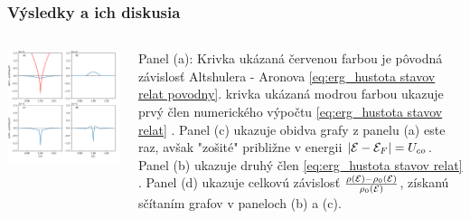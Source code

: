 \documentclass[
	11pt, %
]{beamer}
\begin{document}
\begin{frame}
\frametitle{Výsledky a ich diskusia}
\begin{columns}[c]

\begin{column}{.5\textwidth}
\includegraphics[scale=0.35]{grafy/plot_tau_1_c_1}
\end{column}
\begin{column}{.5\textwidth}
\small
Panel (a): Krivka ukázaná červenou farbou je pôvodná závislosť Altshulera - Aronova \eqref{eq:erg_hustota stavov relat povodny}.
krivka ukázaná modrou farbou ukazuje prvý člen numerického výpočtu \eqref{eq:erg_hustota stavov relat} . Panel (c) ukazuje obidva grafy z panelu (a) este raz, avšak "zošité" približne v energii  $|\mathcal{E}-\mathcal{E}_F| = U_{co}$. Panel (b) ukazuje druhý člen  \eqref{eq:erg_hustota stavov relat} . Panel (d) ukazuje celkovú závislosť $\frac{\rho(\mathcal{E}) - \rho_0(\mathcal{E})}{\rho_0(\mathcal{E})}$, získanú sčítaním grafov v paneloch (b) a (c).
\normalsize
\end{column}
\end{columns}
\end{frame}
\end{document}
